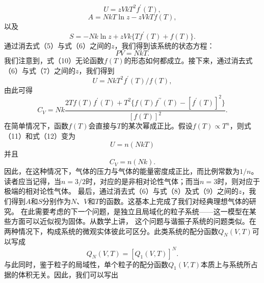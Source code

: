 \begin{equation}\tag{4.4.7}\label{eq:4.4.7}
U = z V k T ^{2} f ^{\prime} ( T ) ,
\end{equation}
\begin{equation}\tag{4.4.8}\label{eq:4.4.8}
A = N k T \ln z - z V k T f ( T ) ,
\end{equation}
以及
\begin{equation}\tag{4.4.9}\label{eq:4.4.9}
S = - N k \ln z + z V k \{ T f ^{\prime} ( T ) + f ( T ) \} .
\end{equation}
通过消去式（5）与式（6）之间的\(z\)，我们得到该系统的状态方程：
\begin{equation}\tag{4.4.10}\label{eq:4.4.10}
P V = N k T .
\end{equation}
我们注意到，式（10）无论函数\(f(T)\)的形态如何都成立。接下来，通过消去式（6）与式（7）之间的\(z\)，我们得到
\begin{equation}\tag{4.4.11}\label{eq:4.4.11}
U = N k T ^{2} f ^{\prime} ( T ) / f ( T ) ,
\end{equation}
由此可得
\begin{equation}\tag{4.4.12}\label{eq:4.4.12}
C _ { V } = N k \frac { 2 T f ( T ) f ^{\prime} ( T ) + T ^{2} \{ f ( T ) f ^{\prime \prime} ( T ) - [ f ^{\prime} ( T ) ] ^{2} \} } { [ f ( T ) ] ^{2} } .
\end{equation}
在简单情况下，函数\(f(T)\)会直接与\(T\)的某次幂成正比。假设\(f(T) \propto T^n\)，则式（11）和式（12）变为
\begin{equation}\tag{4.4.13}\label{eq:4.4.13}
U = n ( N k T )
\end{equation}
并且
\begin{equation}\tag{4.4.14}\label{eq:4.4.14}
C _ { V } = n ( N k ) .
\end{equation}
因此，在这种情况下，气体的压力与气体的能量密度成正比，而比例常数为\(1/n\)。读者应当记得，当\(n=3/2\)时，对应的是非相对论性气体；而当\(n=3\)时，则对应于极端的相对论性气体。
最后，通过消去式（6）与式（8）及式（9）之间的\(z\)，我们得到\(A\)和\(S\)分别作为\(N\)、\(V\)和\(T\)的函数。这基本上完成了我们对经典理想气体的研究。
在此需要考虑的下一个问题，是独立且局域化的粒子系统——这一模型在某些方面可以近似视为固体。从数学上讲，
这个问题与谐振子系统的问题类似。在两种情况下，构成系统的微观实体彼此可区分。此类系统的配分函数\(Q_{N}(V,T)\)可以写成
\begin{equation}\tag{4.4.15}\label{eq:4.4.15}
Q _ { N } ( V , T ) = [ Q _ { 1 } ( V , T ) ] ^{N} .
\end{equation}
与此同时，鉴于粒子的局域性，单个粒子的配分函数\(Q_{1}(V,T)\)本质上与系统所占据的体积无关。因此，我们可以写出
